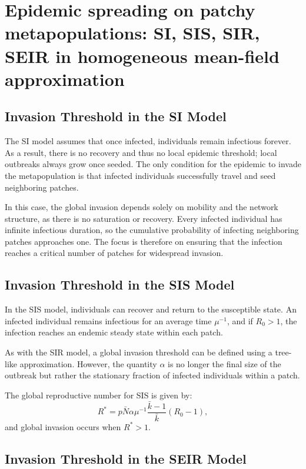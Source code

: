 \section{Epidemic spreading on patchy metapopulations: SI, SIS, SIR, SEIR in homogeneous mean-field approximation}
\label{app:Metapopulations}

\subsection*{Invasion Threshold in the SI Model}

The SI model assumes that once infected, individuals remain infectious forever. As a result, there is no recovery and thus no local epidemic threshold; local outbreaks always grow once seeded. The only condition for the epidemic to invade the metapopulation is that infected individuals successfully travel and seed neighboring patches.

In this case, the global invasion depends solely on mobility and the network structure, as there is no saturation or recovery. Every infected individual has infinite infectious duration, so the cumulative probability of infecting neighboring patches approaches one. The focus is therefore on ensuring that the infection reaches a critical number of patches for widespread invasion.


\subsection*{Invasion Threshold in the SIS Model}

In the SIS model, individuals can recover and return to the susceptible state. An infected individual remains infectious for an average time \( \mu^{-1} \), and if \( R_0 > 1 \), the infection reaches an endemic steady state within each patch.

As with the SIR model, a global invasion threshold can be defined using a tree-like approximation. However, the quantity \( \alpha \) is no longer the final size of the outbreak but rather the stationary fraction of infected individuals within a patch.

The global reproductive number for SIS is given by:
\[
R^* = p\bar{N}\alpha\mu^{-1}\frac{\bar{k}-1}{\bar{k}}(R_0 - 1),
\]
and global invasion occurs when \( R^* > 1 \).

\subsection*{Invasion Threshold in the SEIR Model}

